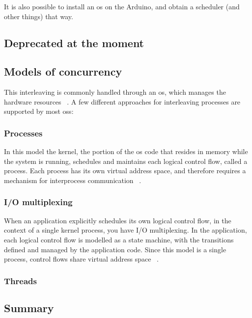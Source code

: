 It is also possible to install an \gls{os} on the Arduino, and obtain a scheduler (and other things) that way.

\subsection*{Deprecated at the moment}
\subsection{Models of concurrency}\label{subsec:modelsofcon}
This interleaving is commonly handled through an \gls{os}, which manages the hardware resources ~\cite{Bryant2016}. A few different approaches for interleaving processes are supported by most \glspl{os}:

\subsubsection{Processes}
In this model the kernel, the portion of the \gls{os} code that resides in memory while the system is running, schedules and maintains each logical control flow, called a process. Each process has its own virtual address space, and therefore requires a mechanism for interprocess communication ~\cite{Bryant2016}.

\subsubsection{I/O multiplexing}
When an application explicitly schedules its own logical control flow, in the context of a single kernel process, you have I/O multiplexing. In the application, each logical control flow is modelled as a state machine, with the transitions defined and managed by the application code. Since this model is a single process, control flows share virtual address space ~\cite{Bryant2016}.

\subsubsection{Threads}


\subsection{Summary}

